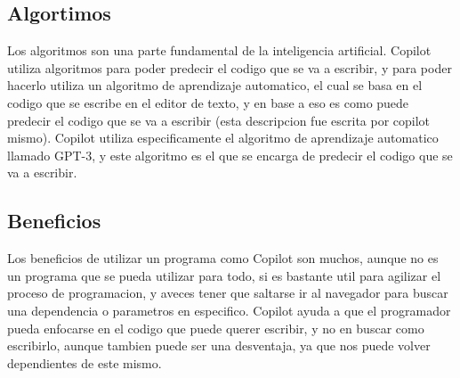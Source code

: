 \documentclass{article}
\begin{document}
\subsection{Algortimos}
Los algoritmos son una parte fundamental de la inteligencia artificial. Copilot utiliza
algoritmos para poder predecir el codigo que se va a escribir, y para poder hacerlo
utiliza un algoritmo de aprendizaje automatico, el cual se basa en el codigo que se
escribe en el editor de texto, y en base a eso es como puede predecir el codigo que
se va a escribir (esta descripcion fue escrita por copilot mismo). Copilot utiliza
especificamente el algoritmo de aprendizaje automatico llamado GPT-3, y este algoritmo
es el que se encarga de predecir el codigo que se va a escribir.

\subsection{Beneficios}
Los beneficios de utilizar un programa como Copilot son muchos, aunque
no es un programa que se pueda utilizar para todo, si es bastante util para
agilizar el proceso de programacion, y aveces tener que saltarse ir al
navegador para buscar una dependencia o parametros en especifico. Copilot
ayuda a que el programador pueda enfocarse en el codigo que puede querer
escribir, y no en buscar como escribirlo, aunque tambien puede ser una
desventaja, ya que nos puede volver dependientes de este mismo.
\end{document}
